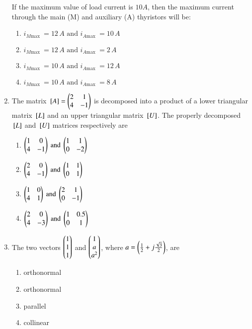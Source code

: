 \documentclass[journal]{IEEEtran}
\begin{document}
\begin{enumerate}[start=27]
If the maximum value of load current is $10 A$, then the maximum current through the main (M) and auxiliary (A) thyristors will be:
\begin{multicols}{2}
\begin{enumerate}
\item $i_{M \text{max }} = 12\,A \text{ and } i_{A \text{max }} = 10\,A$
\item  $i_{M \text{max }} = 12\,A \text{ and } i_{A \text{max }} = 2\,A$
\item  $i_{M \text{max }} = 10\,A \text{ and } i_{A \text{max }} = 12\,A$
\item $i_{M \text{max }} = 10\,A \text{ and } i_{A \text{max }} = 8\,A$
\end{enumerate}
\end{multicols}

\item The matrix ${}\left[A\right]=\begin{pmatrix}2 & 1 \\ 4 & -1\end{pmatrix}$ is decomposed into a product of a lower triangular matrix ${}\left[L\right]$ and an upper triangular matrix ${}\left[U\right]$. The properly decomposed ${}\left[L\right]$ and ${}\left[U\right]$ matrices respectively are
\begin{multicols}{2}
\begin{enumerate}
\item $\begin{pmatrix}1 & 0 \\ 4 & -1\end{pmatrix} \text{ and } \begin{pmatrix}1 & 1 \\ 0 & -2 \end{pmatrix}$
\item $\begin{pmatrix}2 & 0 \\ 4 & -1\end{pmatrix} \text{ and } \begin{pmatrix}1 & 1 \\ 0 & 1 \end{pmatrix}$
\item $\begin{pmatrix}1 & 0 \\ 4 & 1\end{pmatrix} \text{ and } \begin{pmatrix}2& 1 \\ 0 & -1 \end{pmatrix}$
\item $\begin{pmatrix}2 & 0 \\ 4 & -3\end{pmatrix} \text{ and } \begin{pmatrix}1 & 0.5 \\ 0 & 1 \end{pmatrix}$
\end{enumerate}
\end{multicols}


\item The two vectors $\begin{pmatrix}1\\ 1\\ 1\end{pmatrix}$ and $\begin{pmatrix}1\\ a\\ a^2\end{pmatrix}$, where $a = \left( \frac{1}{2} + j\frac{\sqrt{3}}{2} \right)$, are
\begin{multicols}{4}
\begin{enumerate}
\item orthonormal
\item  orthonormal
\item  parallel
\item  collinear
\end{enumerate}
\end{multicols}


\end{enumerate}
\end{document}
